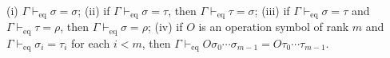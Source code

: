 (i) $\Gamma \vdash_{\text{eq}} \sigma = \sigma$;
(ii) if $\Gamma \vdash_{\text{eq}} \sigma = \tau$, then $\Gamma \vdash_{\text{eq}} \tau = \sigma$;
(iii) if $\Gamma \vdash_{\text{eq}} \sigma = \tau$ and $\Gamma \vdash_{\text{eq}} \tau = \rho$, then $\Gamma \vdash_{\text{eq}} \sigma = \rho$;
(iv) if $O$ is an operation symbol of rank $m$ and $\Gamma \vdash_{\text{eq}} \sigma_i = \tau_i$ for each $i < m$, then $\Gamma \vdash_{\text{eq}} O\sigma_0 \cdots \sigma_{m-1} = O\tau_0 \cdots \tau_{m-1}$.
